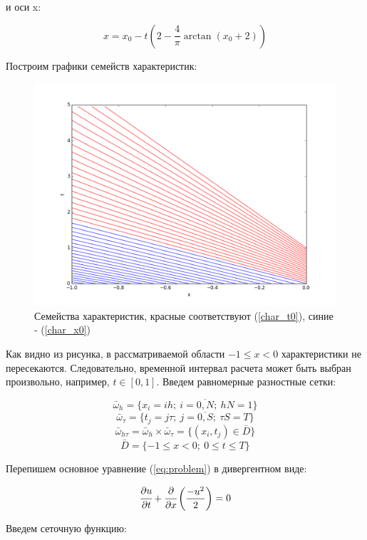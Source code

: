 \documentclass[12pt]{article}
\def\dd#1#2{\cfrac{\partial#1}{\partial#2}}
\begin{document}
		и оси x:
		
		\begin{equation}\label{char_x0}
			x = x_0 - t(2 - \frac{4}{\pi}\arctan(x_0+2))
		\end{equation}
		
		Построим графики семейств характеристик:
		\newpage
		
		\begin{figure}[h]
			\includegraphics[scale = 0.5]{char_1}
			\caption{Семейства характеристик, красные соответствуют (\ref{char_t0}), синие - (\ref{char_x0})}
		\end{figure}
		
		Как видно из рисунка, в рассматриваемой области $ -1 \leq x < 0 $ характеристики не пересекаются. Следовательно, временной интервал расчета может быть выбран произвольно, например, $t \in [0, 1]$.
		Введем равномерные разностные сетки:
		
		$$\bar{\omega}_h = \{x_i = ih;\ i = \overline{0,N};\ hN = 1\}$$
		$$\bar{\omega}_\tau = \{t_j = j\tau;\ j =\overline{0,S};\ \tau S = T\}$$
		$$\bar{\omega}_{h\tau} = \bar{\omega}_h \times \bar{\omega}_\tau = 
		\{ (x_i, t_j) \in \bar{D} \}$$
		$$\bar{D} = \{ -1 \le x < 0;\ 0 \le t \le T \}$$
		
		Перепишем основное уравнение (\ref{eq:problem}) в дивергентном виде:
		
		\begin{equation}
			\dd{u}t + \dd{}x\left(\frac{-u^2}{2}\right) = 0
		\end{equation}
		
		Введем сеточную функцию:
		
\end{document}
